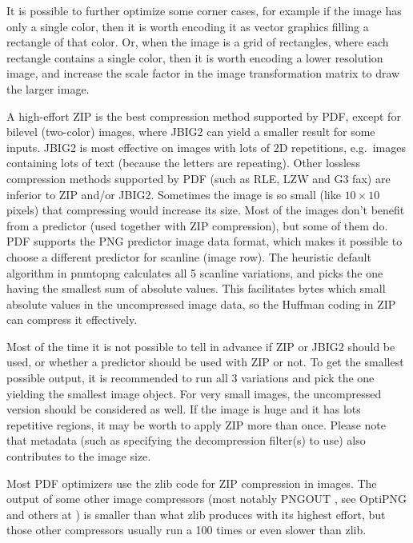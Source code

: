\documentclass{ltugproc}
\def\cmd{\textsf}
\def\pkg{\textsf}
\begin{document}
It is possible to further optimize some corner cases, for example if the
image has only a single color, then it is worth encoding it as vector
graphics filling a rectangle of that color. Or, when the image is a grid of
rectangles, where each rectangle contains a single color, then it is worth
encoding a lower resolution image, and increase the scale factor in the
image transformation matrix to draw the larger image.

A high-effort ZIP is the best compression method supported by PDF, except
for bilevel (two-color) images, where JBIG2 can yield a smaller result for
some inputs. JBIG2 is most effective on images with lots of 2D repetitions,
e.g.\ images containing lots of text (because the letters are repeating).
Other lossless compression methods supported by PDF (such as RLE, LZW and G3
fax) are inferior to ZIP and/or JBIG2. Sometimes the image is so small (like
$10\times10$ pixels) that compressing would increase its size.
Most of the images don't benefit from a predictor (used
together with ZIP compression), but some of them do. PDF supports the PNG
predictor image data format, which makes it possible to choose a different
predictor for scanline (image row). The heuristic default algorithm in
\cmd{pnmtopng} calculates all 5 scanline variations, and picks the one
having the smallest sum of absolute values. This facilitates bytes which
small absolute values in the uncompressed image data, so the Huffman coding
in ZIP can compress it effectively.

Most of the time it is not possible to tell in advance if ZIP or JBIG2
should be used, or whether a predictor should be used with ZIP or not. To
get the smallest possible output, it is recommended to run all 3 variations
and pick the one yielding the smallest image object. For very small images,
the uncompressed version should be considered as well. If the image is huge
and it has lots repetitive regions, it may be worth to apply ZIP more than
once. Please note that metadata (such as specifying the decompression
filter(s) to use) also contributes to the image size.

Most PDF optimizers use the \pkg{zlib} code for ZIP compression in images.
The output of some other image compressors (most notably PNGOUT
\cite{pngout}, see OptiPNG and others at \cite{png-recompressors})
is smaller than what \pkg{zlib} produces with its highest effort, but those
other compressors usually run a 100 times or even slower than \pkg{zlib}.
\end{document}

